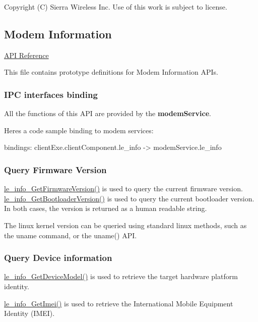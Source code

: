 Copyright (C) Sierra Wireless Inc. Use of this work is subject to license. \hypertarget{c_info}{}\subsection{Modem Information}\label{c_info}
\hyperlink{le__info__interface_8h}{A\+P\+I Reference}





This file contains prototype definitions for Modem Information A\+P\+Is.\hypertarget{c_info_le_info_binding}{}\subsubsection{I\+P\+C interfaces binding}\label{c_info_le_info_binding}
All the functions of this A\+P\+I are provided by the {\bfseries modem\+Service}.

Here\textquotesingle{}s a code sample binding to modem services\+: \begin{DoxyVerb}bindings:
{
   clientExe.clientComponent.le_info -> modemService.le_info
}
\end{DoxyVerb}
\hypertarget{c_info_le_info_version}{}\subsubsection{Query Firmware Version}\label{c_info_le_info_version}
\hyperlink{le__info__interface_8h_ae4a7baef2aac776edefefab68b74a7c6}{le\+\_\+info\+\_\+\+Get\+Firmware\+Version()} is used to query the current firmware version. \hyperlink{le__info__interface_8h_a931797ade737e2eebb09008ce84891ff}{le\+\_\+info\+\_\+\+Get\+Bootloader\+Version()} is used to query the current bootloader version. In both cases, the version is returned as a human readable string.

The linux kernel version can be queried using standard linux methods, such as the uname command, or the uname() A\+P\+I.\hypertarget{c_info_le_info_model}{}\subsubsection{Query Device information}\label{c_info_le_info_model}
\hyperlink{le__info__interface_8h_a4cd7a99fddb014e25880e6354b1d02f8}{le\+\_\+info\+\_\+\+Get\+Device\+Model()} is used to retrieve the target hardware platform identity.

\hyperlink{le__info__interface_8h_a82950824965105fd9041fe5ed7239d79}{le\+\_\+info\+\_\+\+Get\+Imei()} is used to retrieve the International Mobile Equipment Identity (I\+M\+E\+I).

